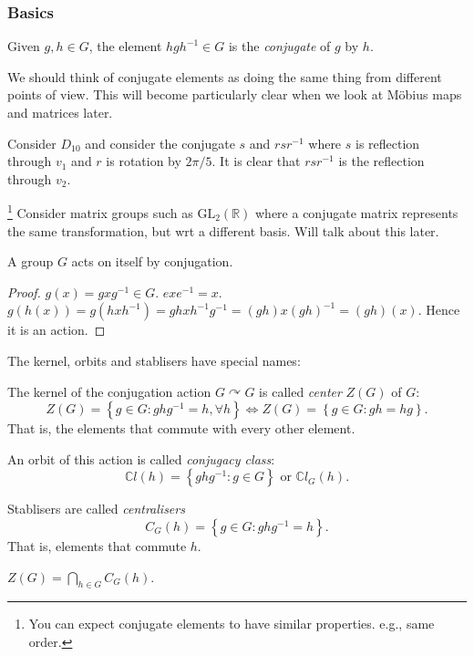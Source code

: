 \documentclass[a4paper]{article}
\begin{document}
\subsubsection{Basics}
\begin{definition}
  Given $g,h\in G$, the element $hgh^{-1}\in G$ is the
  \textit{conjugate} of $g$ by $h$.
\end{definition}
We should think of conjugate elements as doing the same thing from
different points of view. This will become particularly clear when we
look at M\"{o}bius maps and matrices later.
\begin{example}
  Consider $D_{10}$ and consider the conjugate $s$ and $rsr^{-1}$
  where $s$ is reflection through $v_1$ and $r$ is rotation by
  $2\pi/5 $. It is clear that $rsr^{-1}$ is the reflection through $v_2$.
\end{example}
\begin{example}\footnote{You can expect conjugate elements to have
  similar properties. e.g., same order.}
  Consider matrix groups such as $ \mathrm{GL}_2(\mathbb{R}) $ where
  a conjugate matrix represents the same transformation, but wrt a
  different basis. Will talk about this later.
\end{example}
\begin{proposition}\label{prop:5.18}
  A group $G$ acts on itself by conjugation.
\end{proposition}
\begin{proof}
  $g(x)=gxg^{-1}\in G$. $exe^{-1}=x$. $
  g(h(x))=g(hxh^{-1})=ghxh^{-1}g^{-1}=(gh)x(gh)^{-1}=(gh)(x) $. Hence
  it is an action.
\end{proof}
The kernel, orbits and stablisers have special names:
\begin{definition}
  The kernel of the conjugation action $ G \curvearrowright G $ is
  called \textit{center} $ Z(G) $ of $G$:
  \[
    Z(G)=\left\{ g\in G: ghg^{-1}=h, \forall h \right\}
    \Longleftrightarrow Z(G)=\left\{ g\in G: gh=hg \right\}
  .\]
  That is, the elements that commute with every other element.

  An orbit of this action is called \textit{conjugacy class}:
  \[
    \mathbb{C}l(h)=\left\{ ghg^{-1}:g\in G \right\} \text{ or } \mathbb{C}l_G(h)
  .\]

  Stablisers are called \textit{centralisers}
  \[
    C_G(h)=\left\{ g\in G:ghg^{-1}=h \right\}
  .\]
  That is, elements that commute $h$.
\end{definition}
\begin{proposition}
  $\displaystyle Z(G)=\bigcap_{h\in G}C_G(h)$.
\end{proposition}
\end{document}
